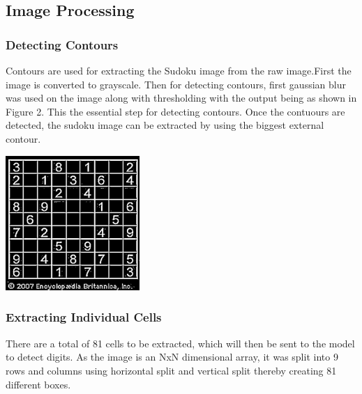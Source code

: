 \documentclass[a4paper,12pt]{article}
\begin{document}
  \subsection{Image Processing}
  \subsubsection{Detecting Contours}
  
  Contours are used for extracting the Sudoku image from the raw image.First the image is converted to grayscale.
  Then for detecting contours, first gaussian blur\cite{opencv_smoothing} was used on the image along with thresholding\cite{opencv_thresholding} with the output being as shown in Figure 2. This the essential step for detecting contours.\cite{opencv_contours}
  Once the contuours are detected, the sudoku image can be extracted by using the biggest external contour.
   \begin{center}
        \includegraphics[width=2in]{thresholding.png}
        \label{fig:figure_label}
    \end{center}
    \subsubsection{Extracting Individual Cells}
    There are a total of 81 cells to be extracted, which will then be sent to the model to detect digits. As the image is an NxN dimensional array, it was split into 9 rows and columns using horizontal split and vertical split\cite{split_array} thereby creating 81 different boxes.
    
\newpage
\twocolumn
\end{document}

